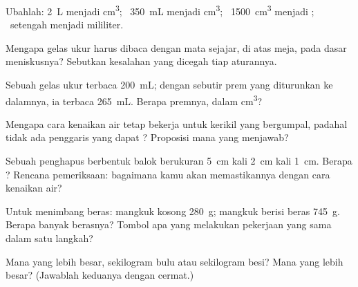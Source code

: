 \begin{exercise}[$\star$]\label{exo:g6:mass-and-volume:2}
Ubahlah: \qty{2}{L} menjadi \unit{cm^3}; \ \qty{350}{mL} menjadi
\unit{cm^3}; \ \qty{1500}{cm^3} menjadi ; \ setengah 
menjadi mililiter.
\end{exercise}

\begin{exercise}[$\star$]\label{exo:g6:mass-and-volume:3}
Mengapa gelas ukur harus dibaca dengan mata sejajar, di atas meja,
pada dasar meniskusnya? Sebutkan kesalahan yang dicegah tiap
aturannya.
\end{exercise}

\begin{exercise}[$\star$]\label{exo:g6:mass-and-volume:4}
Sebuah gelas ukur terbaca \qty{200}{mL}; dengan sebutir prem yang
diturunkan ke dalamnya, ia terbaca \qty{265}{mL}. Berapa 
premnya, dalam \unit{cm^3}?
\end{exercise}

\begin{exercise}[$\star$]\label{exo:g6:mass-and-volume:5}
Mengapa cara kenaikan air tetap bekerja untuk kerikil yang bergumpal,
padahal tidak ada penggaris yang dapat ? Proposisi mana
yang menjawab?
\end{exercise}

\begin{exercise}[$\star$]\label{exo:g6:mass-and-volume:6}
Sebuah penghapus berbentuk balok berukuran \qty{5}{cm} kali
\qty{2}{cm} kali \qty{1}{cm}. Berapa ? Rencana pemeriksaan:
bagaimana kamu akan memastikannya dengan cara kenaikan air?
\end{exercise}

\begin{exercise}[$\star$]\label{exo:g6:mass-and-volume:7}
Untuk menimbang beras: mangkuk kosong \qty{280}{g}; mangkuk berisi
beras \qty{745}{g}. Berapa banyak berasnya? Tombol apa yang melakukan
pekerjaan yang sama dalam satu langkah?
\end{exercise}

\begin{exercise}[$\star$]\label{exo:g6:mass-and-volume:8}
Mana yang  lebih besar, sekilogram bulu atau sekilogram besi?
Mana yang  lebih besar? (Jawablah keduanya dengan cermat.)
\end{exercise}

